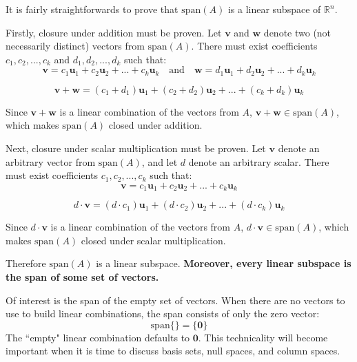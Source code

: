 \documentclass{article}
\begin{document}
It is fairly straightforwards to prove that \(\text{span}(A)\) is a linear subspace of \(\mathbb{R}^n\). 

Firstly, closure under addition must be proven. Let \(\mathbf{v}\) and \(\mathbf{w}\) denote two (not necessarily distinct) vectors from \(\text{span}(A)\). There must exist coefficients \(c_1, c_2, ..., c_k\) and \(d_1, d_2, ..., d_k\) such that: 
\[\mathbf{v} = c_1\mathbf{u}_1 + c_2\mathbf{u}_2 + ... + c_k\mathbf{u}_k \quad\text{and}\quad \mathbf{w} = d_1\mathbf{u}_1 + d_2\mathbf{u}_2 + ... + d_k\mathbf{u}_k\]

\[\mathbf{v} + \mathbf{w} = (c_1 + d_1)\mathbf{u}_1 + (c_2 + d_2)\mathbf{u}_2 + ... + (c_k + d_k)\mathbf{u}_k\]

Since \(\mathbf{v} + \mathbf{w}\) is a linear combination of the vectors from \(A\), \(\mathbf{v} + \mathbf{w} \in \text{span}(A)\), which makes \(\text{span}(A)\) closed under addition. 

Next, closure under scalar multiplication must be proven. Let \(\mathbf{v}\) denote an arbitrary vector from \(\text{span}(A)\), and let \(d\) denote an arbitrary scalar. There must exist coefficients \(c_1, c_2, ..., c_k\) such that: 
\[\mathbf{v} = c_1\mathbf{u}_1 + c_2\mathbf{u}_2 + ... + c_k\mathbf{u}_k\]

\[d \cdot \mathbf{v} = (d \cdot c_1)\mathbf{u}_1 + (d \cdot c_2)\mathbf{u}_2 + ... + (d \cdot c_k)\mathbf{u}_k\]

Since \(d \cdot \mathbf{v}\) is a linear combination of the vectors from \(A\), \(d \cdot \mathbf{v} \in \text{span}(A)\), which makes \(\text{span}(A)\) closed under scalar multiplication.

Therefore \(\text{span}(A)\) is a linear subspace. {\bf Moreover, every linear subspace is the span of some set of vectors.}

Of interest is the span of the empty set of vectors. When there are no vectors to use to build linear combinations, the span consists of only the zero vector:
\[\text{span}\{\} = \{\mathbf{0}\}\]
The ``empty" linear combination defaults to \(\mathbf{0}\). This technicality will become important when it is time to discuss basis sets, null spaces, and column spaces.
\end{document}
